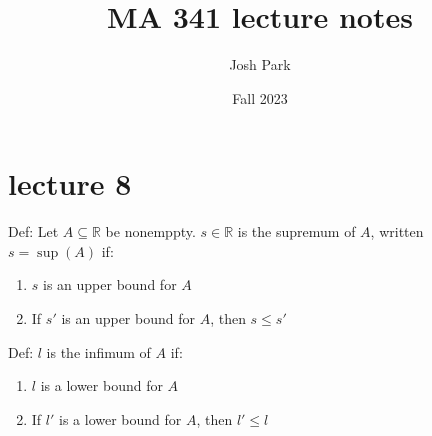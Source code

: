 \documentclass{report}
\title{MA 341 lecture notes}
\author{Josh Park}
\date{Fall 2023}
\newcommand{\R}{\mathbb{R}}  %
\theoremstyle{mystyle}
\theoremstyle{customtheorem}
\begin{document}
    \maketitle
    \setlength{\parindent}{0pt}
    \section*{lecture 8}
    Def: Let $A \subseteq \R$ be nonemppty. $s \in \R$ is the supremum of $A$, written $s=\sup(A)$ if:
    \begin{enumerate}[label=(\roman*)] \vspace{-1em}
        \item $s$ is an upper bound for $A$
        \item If $s'$ is an upper bound for $A$, then $s \leq s'$
    \end{enumerate}

    Def: $l$ is the infimum of $A$ if: \vspace{-1em}
    \begin{enumerate}[label=(\roman*)]
        \item $l$ is a lower bound for $A$
        \item If $l'$ is a lower bound for $A$, then $l'\leq l$
    \end{enumerate}
\end{document}
